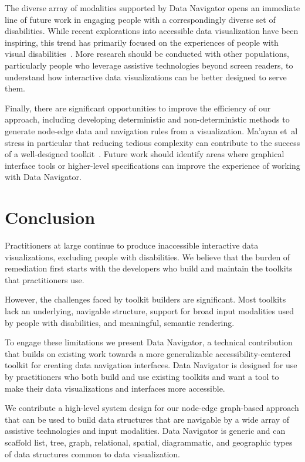 \documentclass[12pt]{cmuthesis}
\newcommand{\ea}{{et~al\xperiod}\xspace}
\begin{document}
The diverse array of modalities supported by Data Navigator opens an immediate line of future work in engaging people with a correspondingly diverse set of disabilities. While recent explorations into accessible data visualization have been inspiring, this trend has primarily focused on the experiences of people with visual disabilities~\cite{Elavsky2022Chartability,Marriott,Kim2021Accessible}. More research should be conducted with other populations, particularly people who leverage assistive technologies beyond screen readers, to understand how interactive data visualizations can be better designed to serve them.

Finally, there are significant opportunities to improve the efficiency of our approach, including developing deterministic and non-deterministic methods to generate node-edge data and navigation rules from a visualization. Ma'ayan \ea stress in particular that reducing tedious complexity can contribute to the success of a well-designed toolkit~\cite{Maayan2020Domain}. Future work should identify areas where graphical interface tools or higher-level specifications can improve the experience of working with Data Navigator.

\section{Conclusion}
Practitioners at large continue to produce inaccessible interactive data visualizations, excluding people with disabilities. We believe that the burden of remediation first starts with the developers who build and maintain the toolkits that practitioners use.

However, the challenges faced by toolkit builders are significant. Most toolkits lack an underlying, navigable structure, support for broad input modalities used by people with disabilities, and meaningful, semantic rendering.

To engage these limitations we present Data Navigator, a technical contribution that builds on existing work towards a more generalizable accessibility-centered toolkit for creating data navigation interfaces. Data Navigator is designed for use by practitioners who both build and use existing toolkits and want a tool to make their data visualizations and interfaces more accessible.

We contribute a high-level system design for our node-edge graph-based approach that can be used to build data structures that are navigable by a wide array of assistive technologies and input modalities. Data Navigator is generic and can scaffold list, tree, graph, relational, spatial, diagrammatic, and geographic types of data structures common to data visualization.
\end{document}
